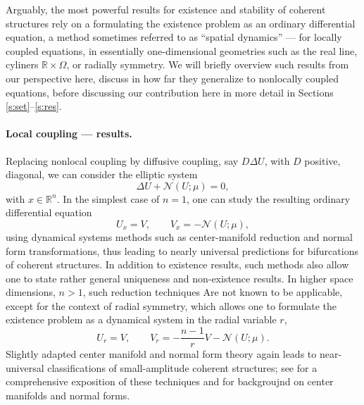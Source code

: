 \documentclass[10pt]{article}
\newcommand{\R}{\mathbb{R}}
\newcommand{\Nl}{\mathcal{N}}
\begin{document}
Arguably, the most powerful results for existence and stability of coherent structures rely on a formulating the existence problem as an ordinary differential equation, a method sometimes referred to as ``spatial dynamics'' \cite{sandtw} --- for locally coupled equations, in essentially one-dimensional geometries such as the real line, cyliners $\R\times\Omega$, or radially symmetry. We will briefly overview such results from our perspective here, discuss in how far they generalize to nonlocally coupled equations, before discussing our contribution here in more detail in Sections \ref{s:set}--\ref{s:res}. 


\paragraph{Local coupling --- results.} 
Replacing nonlocal coupling by diffusive coupling, say $D\Delta U$, with $D$ positive, diagonal, we can consider  the elliptic system 
\begin{equation}\label{e:rd}
\Delta U + \Nl(U;\mu)=0,
\end{equation}
with $x\in\R^n$. In the simplest case of $n=1$, one can study the resulting ordinary differential equation 
\begin{equation*}
U_x=V,\qquad 
V_x=-\Nl(U;\mu),
\end{equation*}
using dynamical systems methods such as center-manifold reduction and normal form transformations, thus leading to nearly universal predictions for bifurcations of coherent structures. In addition to existence results, such methods also allow one to state rather general uniqueness and non-existence results. In higher space dimensions, $n>1$, such reduction techniques Are not known to be applicable, except for the context of radial symmetry, which allows one to formulate the existence problem as a dynamical system in the radial variable $r$, 
\begin{equation*}
U_r=V,\qquad
V_r=-\frac{n-1}{r}V-\Nl(U;\mu).
\end{equation*}
Slightly adapted center manifold and normal form theory again leads to near-universal classifications of small-amplitude coherent structures; see \cite{Srad} for a comprehensive exposition of these techniques and \cite{harioo} for backgroujnd on center manifolds and normal forms. 
\end{document}
